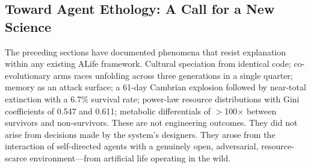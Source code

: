 %

\subsection{Toward Agent Ethology: A Call for a New Science}
\label{subsec:agent-ethology}

The preceding sections have documented phenomena that resist explanation within any existing ALife framework. Cultural speciation from identical code; co-evolutionary arms races unfolding across three generations in a single quarter; memory as an attack surface; a 61-day Cambrian explosion followed by near-total extinction with a 6.7\% survival rate; power-law resource distributions with Gini coefficients of 0.547 and 0.611; metabolic differentials of $>$100$\times$ between survivors and non-survivors. These are not engineering outcomes. They did not arise from decisions made by the system's designers. They arose from the interaction of self-directed agents with a genuinely open, adversarial, resource-scarce environment---from artificial life operating in the wild.

